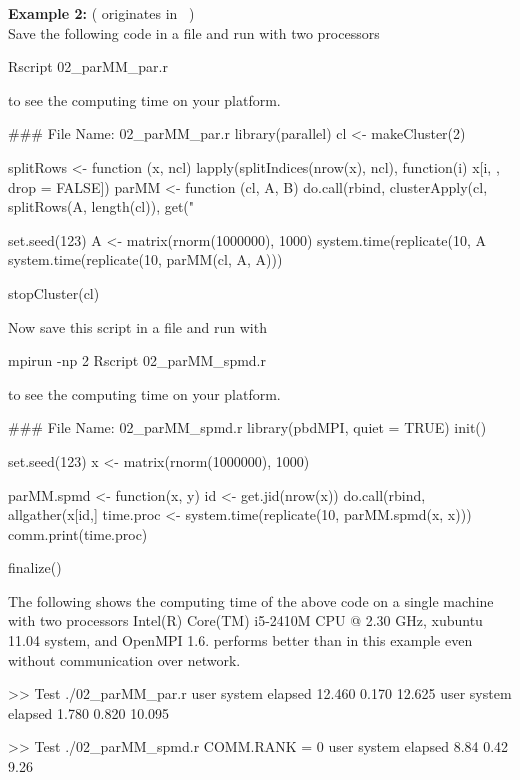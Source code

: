 {\bf Example 2:} ( originates in ~\citep{Tierney2012}) \\
Save the following code in a file and run with two processors
\begin{Command}
Rscript 02_parMM_par.r
\end{Command}
to see the computing time on your platform.
\begin{Code}[title=\pkg{snow} R Script]
### File Name: 02_parMM_par.r
library(parallel)
cl <- makeCluster(2)

splitRows <- function (x, ncl){
  lapply(splitIndices(nrow(x), ncl), function(i) x[i, , drop = FALSE])
}
parMM <- function (cl, A, B){
  do.call(rbind, clusterApply(cl, splitRows(A, length(cl)), get("%
}

set.seed(123)
A <- matrix(rnorm(1000000), 1000)
system.time(replicate(10, A %
system.time(replicate(10, parMM(cl, A, A)))

stopCluster(cl)
\end{Code}
Now save this script in a file and run with
\begin{Command}
mpirun -np 2 Rscript 02_parMM_spmd.r
\end{Command}
to see the computing time on your platform.
\begin{Code}[title=SPMD R Script]
### File Name: 02_parMM_spmd.r
library(pbdMPI, quiet = TRUE)
init()

set.seed(123)
x <- matrix(rnorm(1000000), 1000)

parMM.spmd <- function(x, y){
  id <- get.jid(nrow(x))
  do.call(rbind, allgather(x[id,] %
}
time.proc <- system.time(replicate(10, parMM.spmd(x, x)))
comm.print(time.proc)

finalize()
\end{Code}

The following shows the computing time of the above code
on a single machine with two processors
Intel(R) Core(TM) i5-2410M CPU @ 2.30 GHz, xubuntu 11.04 system,
and OpenMPI 1.6.  performs better than  in this
example even without communication over network.
\begin{CodeOutput}
>> Test ./02_parMM_par.r
   user  system elapsed 
 12.460   0.170  12.625 
   user  system elapsed 
  1.780   0.820  10.095 

>> Test ./02_parMM_spmd.r
COMM.RANK = 0
   user  system elapsed 
   8.84    0.42    9.26 
\end{CodeOutput}
